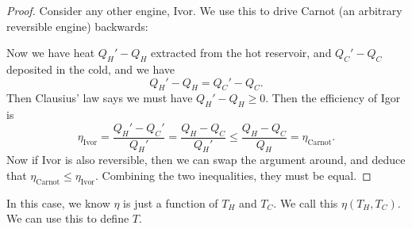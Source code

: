 \documentclass[a4paper]{article}
\begin{document}
\begin{proof}
  Consider any other engine, Ivor. We use this to drive Carnot (an arbitrary reversible engine) backwards:
  \begin{center}
  \end{center}
  Now we have heat $Q_H' - Q_H$ extracted from the hot reservoir, and $Q_C' - Q_C$ deposited in the cold, and we have
  \[
     Q_H' - Q_H = Q_C' - Q_C.
  \]
  Then Clausius' law says we must have $Q_H' - Q_H \geq 0$. Then the efficiency of Igor is
  \[
    \eta_{\mathrm{Ivor}} = \frac{Q_H' - Q_C'}{Q_H'} = \frac{Q_H - Q_C}{Q_H'} \leq \frac{Q_H - Q_C}{Q_H} = \eta_{\mathrm{Carnot}}.
  \]
  Now if Ivor is also reversible, then we can swap the argument around, and deduce that $\eta_{\mathrm{Carnot}} \leq \eta_{\mathrm{Ivor}}$. Combining the two inequalities, they must be equal.
\end{proof}
In this case, we know $\eta$ is just a function of $T_H$ and $T_C$. We call this $\eta(T_H, T_C)$. We can use this to define $T$.
\end{document}
